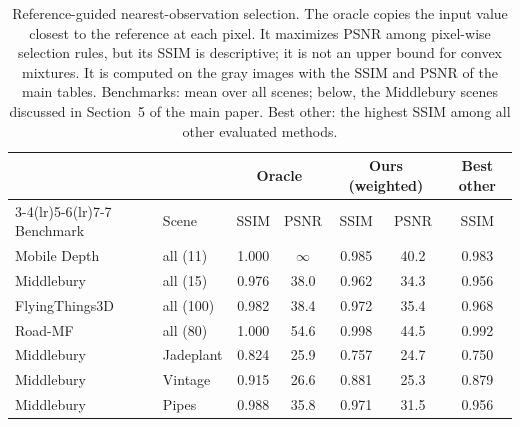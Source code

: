 \begin{table}[htbp]
\centering
\scriptsize
\setlength{\tabcolsep}{4pt}
\caption{Reference-guided nearest-observation selection. The oracle copies the input value closest to the reference at each pixel. It maximizes PSNR among pixel-wise selection rules, but its SSIM is descriptive; it is not an upper bound for convex mixtures. It is computed on the gray images with the SSIM and PSNR of the main tables. Benchmarks: mean over all scenes; below, the Middlebury scenes discussed in Section~5 of the main paper. Best other: the highest SSIM among all other evaluated methods.}
\label{tab:supp_oracle}
\begin{tabular}{llccccc}
\toprule
 & & \multicolumn{2}{c}{Oracle} & \multicolumn{2}{c}{Ours (weighted)} & Best other \\
\cmidrule(lr){3-4}\cmidrule(lr){5-6}\cmidrule(lr){7-7}
Benchmark & Scene & SSIM & PSNR & SSIM & PSNR & SSIM \\
\midrule
Mobile Depth & all (11) & 1.000 & $\infty$ & 0.985 & 40.2 & 0.983 \\
Middlebury & all (15) & 0.976 & 38.0 & 0.962 & 34.3 & 0.956 \\
FlyingThings3D & all (100) & 0.982 & 38.4 & 0.972 & 35.4 & 0.968 \\
Road-MF & all (80) & 1.000 & 54.6 & 0.998 & 44.5 & 0.992 \\
\midrule
Middlebury & Jadeplant & 0.824 & 25.9 & 0.757 & 24.7 & 0.750 \\
Middlebury & Vintage & 0.915 & 26.6 & 0.881 & 25.3 & 0.879 \\
Middlebury & Pipes & 0.988 & 35.8 & 0.971 & 31.5 & 0.956 \\
\bottomrule
\end{tabular}
\end{table}
